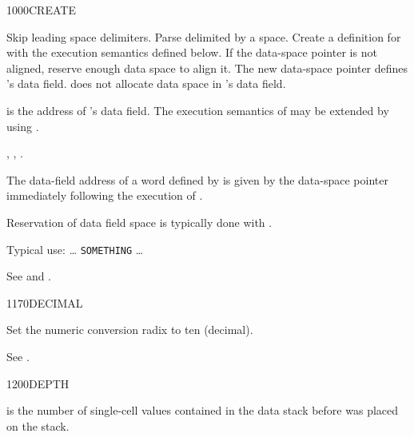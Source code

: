 \vspace*{-3ex}
\begin{worddef}{1000}{CREATE}
\item {}

	Skip leading space delimiters. Parse  delimited by a
	space. Create a definition for  with the execution
	semantics defined below. If the data-space pointer is not
	aligned, reserve enough data space to align it. The new
	data-space pointer defines 's data field.
	 does not allocate data space in 's
	data field.

\execute[name]

	 is the address of 's data field.
	The execution semantics of  may be extended by
	using .

\see {},
	,
	.

	\begin{rationale} %
		The data-field address of a word defined by  is
		given by the data-space pointer immediately following the
		execution of .

		Reservation of data field space is typically done with
		.

		Typical use: {\ldots}
			 \texttt{SOMETHING} {\ldots}
	\end{rationale}

	\begin{testing} %
		See  and
			.
	\end{testing}
\end{worddef}

\vspace*{-3ex}
\enlargethispage{10ex}
\begin{worddef}{1170}{DECIMAL}
\item \stack{}{}

	Set the numeric conversion radix to ten (decimal).

	\begin{testing} %
		See .
	\end{testing}
\end{worddef}

\vspace*{-2ex}
\begin{worddef}{1200}{DEPTH}
\item {}

	 is the number of single-cell values contained in the
	data stack before  was placed on the stack.

	\begin{testing} %
		 \\
		 \\
	\end{testing}
\end{worddef}

